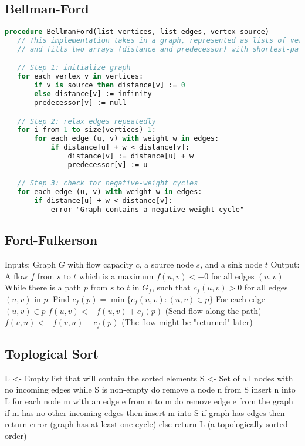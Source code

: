 \documentclass[10pt,a4paper]{article}
\begin{document}
\subsection*{Bellman-Ford}
\begin{lstlisting}[language=Pascal]
procedure BellmanFord(list vertices, list edges, vertex source)
   // This implementation takes in a graph, represented as lists of vertices and edges,
   // and fills two arrays (distance and predecessor) with shortest-path information

   // Step 1: initialize graph
   for each vertex v in vertices:
       if v is source then distance[v] := 0
       else distance[v] := infinity
       predecessor[v] := null

   // Step 2: relax edges repeatedly
   for i from 1 to size(vertices)-1:
       for each edge (u, v) with weight w in edges:
           if distance[u] + w < distance[v]:
               distance[v] := distance[u] + w
               predecessor[v] := u

   // Step 3: check for negative-weight cycles
   for each edge (u, v) with weight w in edges:
       if distance[u] + w < distance[v]:
           error "Graph contains a negative-weight cycle"
\end{lstlisting}


\subsection*{Ford-Fulkerson}
Inputs: Graph $G$ with flow capacity $c$, a source node $s$, and a sink node $t$
Output: A flow $f$ from $s$ to $t$ which is a maximum
$f(u,v) <- 0$ for all edges $(u,v)$
While there is a path $p$ from $s$ to $t$ in $G_f$, such that $c_f(u,v) > 0$ for all edges $(u,v)$ in $p$:
Find $c_f(p) = \min\{c_f(u,v) : (u,v) \in p\}$
For each edge $(u,v) \in p$
$f(u,v) <- f(u,v) + c_f(p)$ (Send flow along the path)
$f(v,u) <- f(v,u) - c_f(p)$ (The flow might be "returned" later)


\subsection*{Toplogical Sort}
L <- Empty list that will contain the sorted elements
S <- Set of all nodes with no incoming edges
while S is non-empty do
    remove a node n from S
    insert n into L
    for each node m with an edge e from n to m do
        remove edge e from the graph
        if m has no other incoming edges then
            insert m into S
if graph has edges then
    return error (graph has at least one cycle)
else 
    return L (a topologically sorted order)
\end{document}
